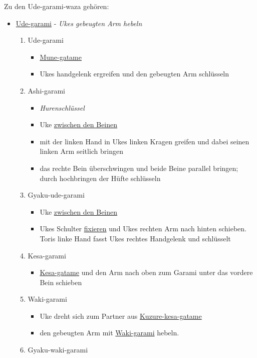 \documentclass[justified, a4paper, notitlepage, captions=tableheading, nobib]{tufte-handout}
\begin{document}
Zu den \label{org62966db}Ude-garami-waza gehören:
\begin{itemize}
\item \hyperref[org39190ac]{Ude-garami} - \emph{Ukes gebeugten Arm hebeln}

\begin{enumerate}
\item \label{org39190ac}Ude-garami
\begin{itemize}
\item \hyperref[org97af0c8]{Mune-gatame}
\item Ukes handgelenk ergreifen und den gebeugten Arm schlüsseln
\end{itemize}
\item \label{org40ccc1b}Ashi-garami 
\begin{itemize}
\item \emph{\label{org705af5a}Hurenschlüssel}
\item Uke \hyperref[org9bede9d]{zwischen den Beinen}
\item mit der linken Hand in Ukes linken Kragen greifen und dabei seinen linken Arm seitlich bringen
\item das rechte Bein überschwingen und beide Beine parallel bringen; durch hochbringen der Hüfte schlüsseln
\end{itemize}
\item \label{org4d9b071}Gyaku-ude-garami
\begin{itemize}
\item Uke \hyperref[org9bede9d]{zwischen den Beinen}
\item Ukes Schulter \hyperref[org62822f6]{fixieren} und Ukes rechten Arm nach hinten schieben. Toris linke Hand fasst Ukes rechtes Handgelenk und schlüsselt
\end{itemize}
\item \label{orgf996a42}Kesa-garami
\begin{itemize}
\item \hyperref[org06d0492]{Kesa-gatame} und den Arm nach oben zum Garami unter das vordere Bein schieben
\end{itemize}
\item \label{org8c40851}Waki-garami 
\begin{itemize}
\item Uke dreht sich zum Partner aus \hyperref[org9725a6e]{Kuzure-kesa-gatame}
\item den gebeugten Arm mit \hyperref[org8c40851]{Waki-garami} hebeln.
\end{itemize}
\item \label{org39a4429}Gyaku-waki-garami

\end{enumerate}
\end{itemize}
\end{document}
